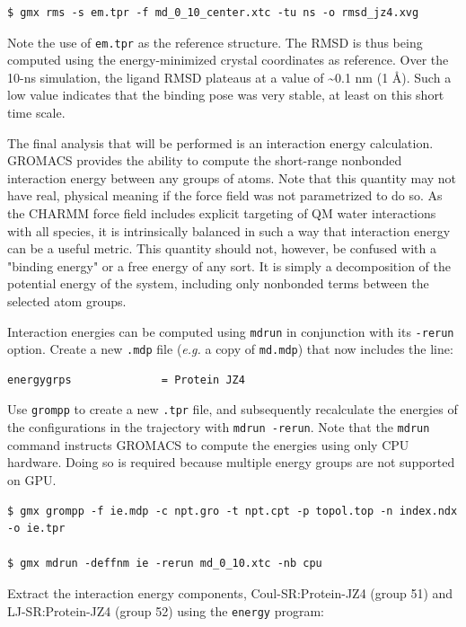 \documentclass[9pt,tutorial,pubversion]{livecoms}
\begin{document}
\begin{lstlisting}
$ gmx rms -s em.tpr -f md_0_10_center.xtc -tu ns -o rmsd_jz4.xvg
\end{lstlisting}

Note the use of \texttt{em.tpr} as the reference structure. The RMSD is thus being computed using the energy-minimized crystal coordinates as reference. Over the 10-ns simulation, the ligand RMSD plateaus at a value of \textasciitilde0.1 nm (1 \AA). Such a low value indicates that the binding pose was very stable, at least on this short time scale.

The final analysis that will be performed is an interaction energy calculation. GROMACS provides the ability to compute the short-range nonbonded interaction energy between any groups of atoms. Note that this quantity may not have real, physical meaning if the force field was not parametrized to do so. As the CHARMM force field includes explicit targeting of QM water interactions with all species, it is intrinsically balanced in such a way that interaction energy can be a useful metric. This quantity should not, however, be confused with a "binding energy" or a free energy of any sort. It is simply a decomposition of the potential energy of the system, including only nonbonded terms between the selected atom groups.

Interaction energies can be computed using \texttt{mdrun} in conjunction with its \texttt{-rerun} option. Create a new \texttt{.mdp} file ({\em e.g.} a copy of \texttt{md.mdp}) that now includes the line:

\begin{lstlisting}
energygrps              = Protein JZ4
\end{lstlisting}

Use \texttt{grompp} to create a new \texttt{.tpr} file, and subsequently recalculate the energies of the configurations in the trajectory with \texttt{mdrun -rerun}. Note that the \texttt{mdrun} command instructs GROMACS to compute the energies using only CPU hardware. Doing so is required because multiple energy groups are not supported on GPU.

\begin{lstlisting}
$ gmx grompp -f ie.mdp -c npt.gro -t npt.cpt -p topol.top -n index.ndx -o ie.tpr

$ gmx mdrun -deffnm ie -rerun md_0_10.xtc -nb cpu
\end{lstlisting}

Extract the interaction energy components, Coul-SR:Protein-JZ4 (group 51) and LJ-SR:Protein-JZ4 (group 52) using the \texttt{energy} program:
\end{document}
